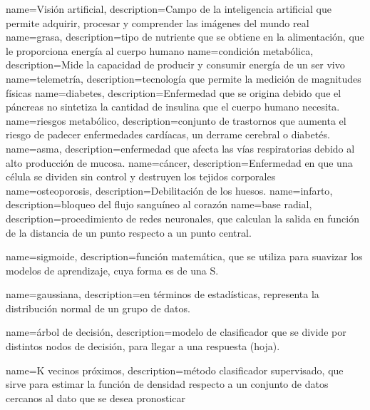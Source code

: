  {
 name={Visi\'on artificial},
 description={Campo de la  inteligencia artificial que permite adquirir, procesar y comprender las im\'agenes del mundo real}
 }
 {
 name={grasa},
 description={tipo de nutriente que se obtiene en la alimentaci\'on, que le proporciona energ\'ia al cuerpo humano}
 }
 {
 name={condici\'on metab\'olica},
 description={Mide la capacidad de producir y consumir energ\'ia de un ser vivo}
 }
 {
 name={telemetr\'ia},
 description={tecnolog\'ia que permite la medici\'on de magnitudes f\'isicas}
 }
 {
 name={diabetes},
 description={Enfermedad que se origina debido que el p\'ancreas no sintetiza la cantidad de insulina que el cuerpo humano necesita.}
 }
 {
 name={riesgos metab\'olico},
 description={conjunto de trastornos que aumenta el riesgo de padecer enfermedades card\'iacas, un derrame cerebral o diabet\'es.}
 }
 {
 name={asma},
 description={enfermedad que afecta las v\'ias respiratorias debido al alto producci\'on de mucosa.}
 }
 {
 name={c\'ancer},
 description={Enfermedad en que una c\'elula se dividen sin control y destruyen los tejidos corporales}
 }
 {
 name={osteoporosis},
 description={Debilitaci\'on de los huesos. }
 }
 {
 name={infarto},
 description={bloqueo del flujo sangu\'ineo al coraz\'on}
 }
 {
 name={base radial},
 description={procedimiento de redes neuronales, que calculan la salida en funci\'on de la distancia de un punto respecto a un punto central. }
 }
 
 {
 name={sigmoide},
 description={funci\'on matem\'atica, que se utiliza para suavizar los modelos de aprendizaje, cuya forma es de una S. }
 }
 
 {
 name={gaussiana},
 description={en t\'erminos de estad\'isticas, representa la distribuci\'on normal de un grupo de datos.}
 }
 
 {
 name={\'arbol de decisi\'on},
 description={modelo de clasificador que se divide por distintos nodos de decisi\'on, para llegar a una respuesta (hoja).}
 }
 
 {
 name={K vecinos pr\'oximos},
 description={m\'etodo clasificador supervisado, que sirve para estimar la funci\'on de densidad respecto a un conjunto de datos cercanos al dato que se desea pronosticar}
 } 
 
